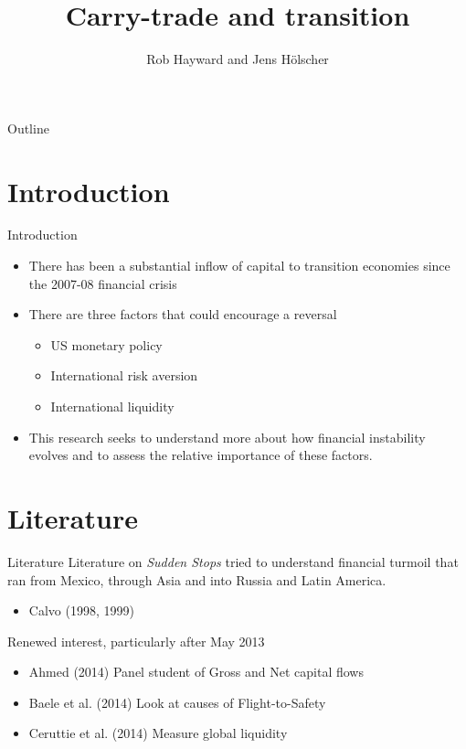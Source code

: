 \documentclass[14pt,xcolor=pdftex,dvipsnames,table]{beamer}
\title{Carry-trade and transition}
\author{Rob Hayward and Jens H\"{o}lscher}
\begin{document}
\begin{frame}
\titlepage
\end{frame}

\begin{frame}{Outline}
\tableofcontents
\end{frame}

\section{Introduction}
\begin{frame}{Introduction}
\begin{itemize}[<+-| alert@+>]
\item There has been a substantial inflow of capital to transition economies since the 2007-08 financial crisis
\item There are three factors that could encourage a reversal
\begin{itemize}[<+-| alert@+>]
\item US monetary policy
\item International risk aversion
\item International liquidity
\end{itemize}
\item This research seeks to understand more about how financial instability evolves and to assess the relative importance of these factors.
\end{itemize}
\end{frame}



\section{Literature}
\begin{frame}{Literature}
Literature on \emph{Sudden Stops} tried to understand financial turmoil that ran from Mexico, through Asia and into Russia and Latin America.
\begin{itemize}[<+-| alert@+>]
\item Calvo (1998, 1999)
\end{itemize}
\pause
Renewed interest, particularly after May 2013
\begin{itemize}
\item Ahmed (2014) Panel student of Gross and Net capital flows
\item Baele et al. (2014) Look at causes of Flight-to-Safety  
\item Ceruttie et al. (2014) Measure global liquidity 
\end{itemize}
\end{frame}
\end{document}
